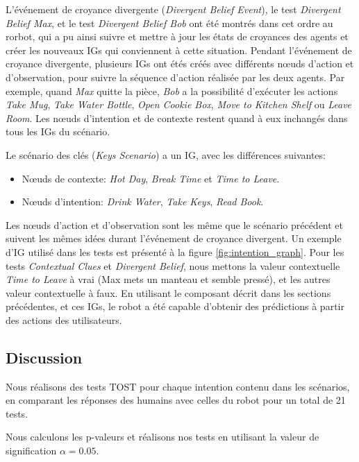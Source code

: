\documentclass[a4paper,11pt,twoside]{StyleThese}
\begin{document}
L'événement de croyance divergente (\textit{Divergent Belief Event}), le test \textit{Divergent Belief Max}, et le test \textit{Divergent Belief Bob} ont été montrés dans cet ordre au rorbot, qui a pu ainsi suivre et mettre à jour les états de croyances des agents et créer les nouveaux IGs qui conviennent à cette situation. Pendant l'événement de croyance divergente, plusieurs IGs ont étés créés avec différents nœuds d'action et d'observation, pour suivre la séquence d'action réalisée par les deux agents. Par exemple, quand  \textit{Max} quitte la pièce, \textit{Bob} a la possibilité d'exécuter les actions \textit{Take Mug}, \textit{Take Water Bottle}, \textit{Open Cookie Box}, \textit{Move to Kitchen Shelf} ou \textit{Leave Room}. Les nœuds d'intention et de contexte restent quand à eux inchangés dans tous les IGs du scénario.


Le scénario des clés (\textit{Keys Scenario}) a un IG, avec les différences suivantes:
\begin{itemize}
\item Nœuds de contexte: \textit{Hot Day}, \textit{Break Time} et \textit{Time to Leave}.
\item Nœuds d'intention: \textit{Drink Water}, \textit{Take Keys}, \textit{Read Book}.
\end{itemize}

Les nœuds d'action et d'observation sont les même que le scénario précédent et suivent les mêmes idées durant l'événement de croyance divergent. Un exemple d'IG utilisé dans les tests est présenté à la figure \ref{fig:intention_graph}. Pour les tests \textit{Contextual Clues} et \textit{Divergent Belief}, nous mettons la valeur contextuelle \textit{Time to Leave} à vrai (Max mets un manteau et semble pressé), et les autres valeur contextuelle à faux. En utilisant le composant décrit dans les sections précédentes, et ces IGs, le robot a été capable d'obtenir des prédictions à partir des actions des utilisateurs.

\subsection{Discussion}
\label{discussion}
Nous réalisons des tests TOST pour chaque intention contenu dans les scénarios, en comparant les réponses des humains avec celles du robot pour un total de 21 tests.

Nous calculons les p-valeurs et réalisons nos tests en utilisant la valeur de signification $\alpha=0.05$.
\end{document}
